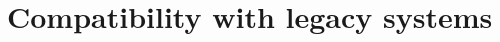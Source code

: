 \documentclass[conference]{IEEEtran}
\begin{document}







\section{Compatibility with legacy systems}

\end{document}
